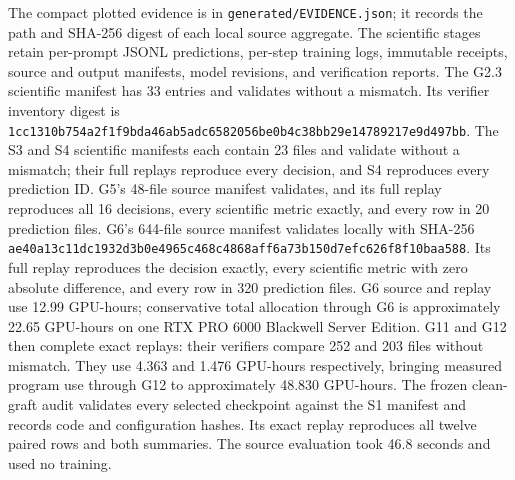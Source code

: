\documentclass{article}
\begin{document}
The compact plotted evidence is in \texttt{generated/EVIDENCE.json}; it records
the path and SHA-256 digest of each local source aggregate. The scientific
stages retain per-prompt JSONL predictions, per-step training logs, immutable
receipts, source and output manifests, model revisions, and verification
reports. The G2.3 scientific manifest has 33 entries and validates without a
mismatch. Its verifier inventory digest is
\texttt{1cc1310b754a2f1f9bda46ab5adc6582056be0b4c38bb29e14789217e9d497bb}.
The S3 and S4 scientific manifests each contain 23 files and validate without a
mismatch; their full replays reproduce every decision, and S4 reproduces every
prediction ID. G5's 48-file source manifest validates, and its full replay
reproduces all 16 decisions, every scientific metric exactly, and every row in
20 prediction files. G6's 644-file source manifest validates locally with SHA-256
\texttt{ae40a13c11dc1932d3b0e4965c468c4868aff6a73b150d7efc626f8f10baa588}.
Its full replay reproduces the decision exactly, every scientific metric with
zero absolute difference, and every row in 320 prediction files. G6 source and
replay use 12.99 GPU-hours; conservative total allocation through G6 is
approximately 22.65 GPU-hours on one RTX PRO 6000 Blackwell Server Edition.
G11 and G12 then complete exact replays: their verifiers compare 252 and 203
files without mismatch. They use 4.363 and 1.476 GPU-hours respectively,
bringing measured program use through G12 to approximately 48.830 GPU-hours.
The frozen clean-graft audit validates every selected checkpoint against the S1
manifest and records code and configuration hashes. Its exact replay reproduces
all twelve paired rows and both summaries. The source evaluation took 46.8
seconds and used no training.
\end{document}
